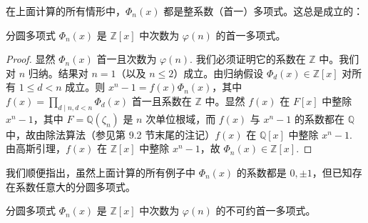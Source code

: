 在上面计算的所有情形中，\(\Phi_n(x)\) 都是整系数（首一）多项式。这总是成立的：

\begin{lemma}\label{lem:13.40}
分圆多项式 \(\Phi_n(x)\) 是 \(\mathbb{Z}[x]\) 中次数为 \(\varphi(n)\) 的首一多项式。
\end{lemma}

\begin{proof}
显然 \(\Phi_n(x)\) 首一且次数为 \(\varphi(n)\). 我们必须证明它的系数在 \(\mathbb{Z}\) 中。我们对 \(n\) 归纳。结果对 \(n = 1\)（以及 \(n \leq 2\)）成立。由归纳假设 \(\Phi_d(x) \in \mathbb{Z}[x]\) 对所有 \(1 \leq d < n\) 成立。则 \(x^n-1 = f(x)\Phi_n(x)\)，其中 \(f(x) = \prod_{d \mid n, d < n}\Phi_d(x)\) 首一且系数在 \(\mathbb{Z}\) 中。显然 \(f(x)\) 在 \(F[x]\) 中整除 \(x^n-1\)，其中 \(F = \mathbb{Q}(\zeta_n)\) 是 \(n\) 次单位根域，而 \(f(x)\) 与 \(x^n-1\) 的系数都在 \(\mathbb{Q}\) 中，故由除法算法（参见第 9.2 节末尾的注记）\(f(x)\) 在 \(\mathbb{Q}[x]\) 中整除 \(x^n-1\). 由高斯引理，\(f(x)\) 在 \(\mathbb{Z}[x]\) 中整除 \(x^n-1\)，故 \(\Phi_n(x) \in \mathbb{Z}[x]\).
\end{proof}

我们顺便指出，虽然上面计算的所有例子中 \(\Phi_n(x)\) 的系数都是 \(0, \pm1\)，但已知存在系数任意大的分圆多项式。

\begin{theorem}\label{thm:13.41}
分圆多项式 \(\Phi_n(x)\) 是 \(\mathbb{Z}[x]\) 中次数为 \(\varphi(n)\) 的不可约首一多项式。
\end{theorem}

